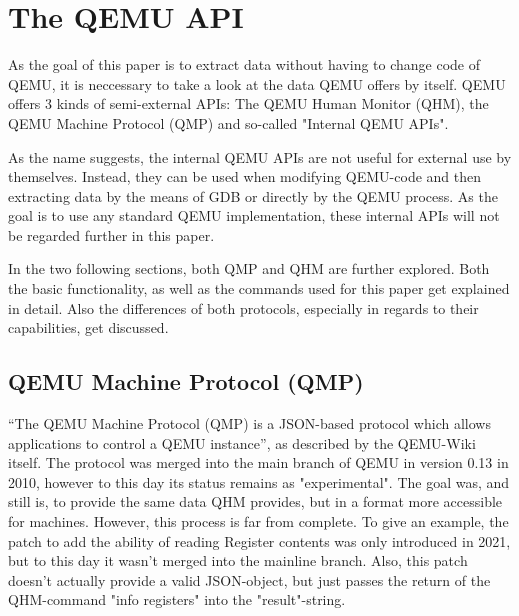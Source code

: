 
\chapter{The QEMU API}
As the goal of this paper is to extract data without having to change code of QEMU,
it is neccessary to take a look at the data QEMU offers by itself.
QEMU offers 3 kinds of semi-external APIs: The QEMU Human Monitor (QHM),
the QEMU Machine Protocol (QMP) and so-called "Internal QEMU APIs"\cite{internal}.

As the name suggests, the internal QEMU APIs are not useful for external use by themselves.
Instead, they can be used when modifying QEMU-code and then extracting data by the means of GDB or directly by the QEMU process.
As the goal is to use any standard QEMU implementation, these internal APIs will not be regarded further in this paper.

In the two following sections, both QMP and QHM are further explored. Both the basic functionality,
as well as the commands used for this paper get explained in detail.
Also the differences of both protocols, especially in regards to their capabilities,
get discussed.

\section{QEMU Machine Protocol (QMP)} \label{sec:QMP}
\enquote{The QEMU Machine Protocol (QMP) is a JSON-based protocol which allows applications to control a QEMU instance}\cite{qmp-description}, as described by the QEMU-Wiki itself.
The protocol was merged into the main branch of QEMU in version 0.13 in 2010, however to this day its status remains as "experimental"\cite{qmp-merge}.
The goal was, and still is, to provide the same data QHM provides, but in a format more accessible for machines.
However, this process is far from complete. To give an example, the patch to add the ability of reading Register contents was only introduced in 2021,
but to this day it wasn't merged into the mainline branch.
Also, this patch doesn't actually provide a valid JSON-object, but just passes the return of the QHM-command "info registers" into the "result"-string\cite{qmp-registers-patch}.

